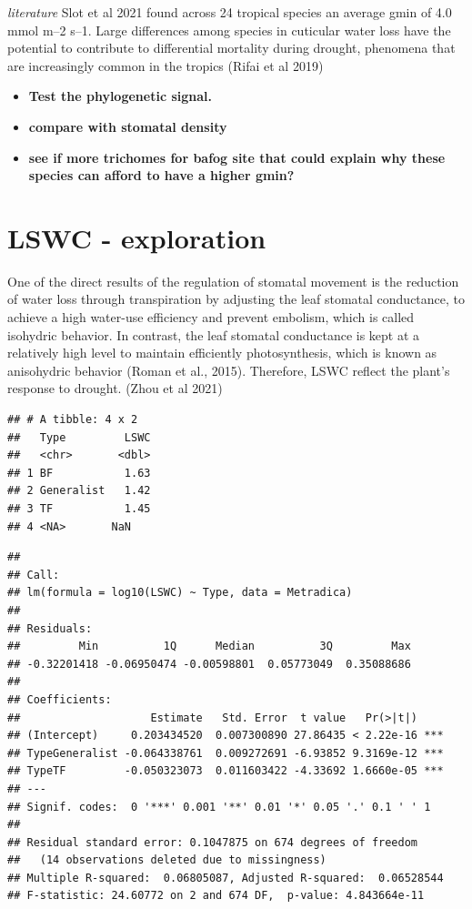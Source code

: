 \documentclass[
]{book}
\providecommand{\tightlist}{%
  \setlength{\itemsep}{0pt}\setlength{\parskip}{0pt}}
\begin{document}
\emph{literature} Slot et al 2021 found across 24 tropical species an average gmin of 4.0 mmol m--2 s--1. Large differences among species in cuticular water loss have the potential to contribute to differential mortality during drought, phenomena that are increasingly common in the tropics (Rifai et al 2019)

\begin{itemize}
\tightlist
\item
  \textbf{Test the phylogenetic signal.}
\item
  \textbf{compare with stomatal density}
\item
  \textbf{see if more trichomes for bafog site that could explain why these species can afford to have a higher gmin?}
\end{itemize}

\hypertarget{lswc---exploration}{%
\section{LSWC - exploration}\label{lswc---exploration}}

One of the direct results of the regulation of stomatal movement is the reduction of water loss through transpiration by adjusting the leaf stomatal conductance, to achieve a high water-use efficiency and prevent embolism, which is called isohydric behavior. In contrast, the leaf stomatal conductance is kept at a relatively high level to maintain efficiently photosynthesis, which is known as anisohydric behavior (Roman et al., 2015). Therefore, LSWC reflect the plant's response to drought. (Zhou et al 2021)

\begin{verbatim}
## # A tibble: 4 x 2
##   Type         LSWC
##   <chr>       <dbl>
## 1 BF           1.63
## 2 Generalist   1.42
## 3 TF           1.45
## 4 <NA>       NaN
\end{verbatim}

\begin{verbatim}
## 
## Call:
## lm(formula = log10(LSWC) ~ Type, data = Metradica)
## 
## Residuals:
##         Min          1Q      Median          3Q         Max 
## -0.32201418 -0.06950474 -0.00598801  0.05773049  0.35088686 
## 
## Coefficients:
##                    Estimate   Std. Error  t value   Pr(>|t|)    
## (Intercept)     0.203434520  0.007300890 27.86435 < 2.22e-16 ***
## TypeGeneralist -0.064338761  0.009272691 -6.93852 9.3169e-12 ***
## TypeTF         -0.050323073  0.011603422 -4.33692 1.6660e-05 ***
## ---
## Signif. codes:  0 '***' 0.001 '**' 0.01 '*' 0.05 '.' 0.1 ' ' 1
## 
## Residual standard error: 0.1047875 on 674 degrees of freedom
##   (14 observations deleted due to missingness)
## Multiple R-squared:  0.06805087, Adjusted R-squared:  0.06528544 
## F-statistic: 24.60772 on 2 and 674 DF,  p-value: 4.843664e-11
\end{verbatim}
\end{document}

